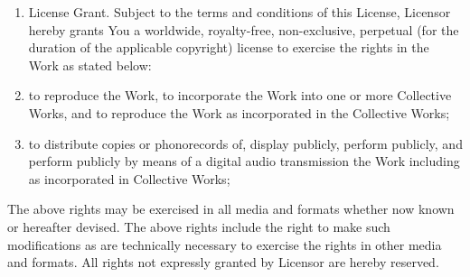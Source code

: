 \begin{enumerate}[1.]
\item
  License Grant. Subject to the terms and conditions of this License,
  Licensor hereby grants You a worldwide, royalty-free,
  non-exclusive, perpetual (for the duration of the applicable
  copyright) license to exercise the rights in the Work as stated
  below:

\item
  to reproduce the Work, to incorporate the Work into one or more
  Collective Works, and to reproduce the Work as incorporated in the
  Collective Works;

\item
  to distribute copies or phonorecords of, display publicly, perform
  publicly, and perform publicly by means of a digital audio
  transmission the Work including as incorporated in Collective
  Works;

\end{enumerate}
The above rights may be exercised in all media and formats whether
now known or hereafter devised. The above rights include the right
to make such modifications as are technically necessary to exercise
the rights in other media and formats. All rights not expressly
granted by Licensor are hereby reserved.

